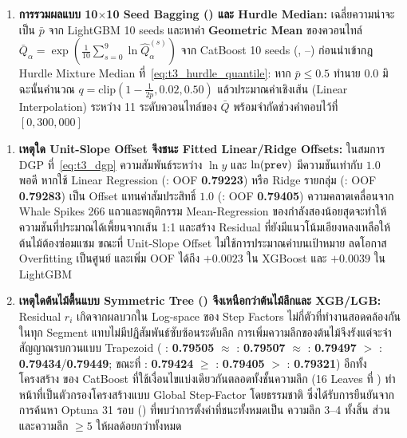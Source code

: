 \begin{enumerate}
\[    \]
    \item \textbf{การรวมผลแบบ 10$\times$10 Seed Bagging () และ Hurdle Median:} เฉลี่ยความน่าจะเป็น $\bar{p}$ จาก LightGBM 10 seeds และหาค่า \textbf{Geometric Mean} ของควอนไทล์ $\bar{Q}_{\alpha} = \exp\!\left(\frac{1}{10}\sum_{s=0}^{9}\ln \hat{Q}_{\alpha}^{(s)}\right)$ จาก CatBoost  10 seeds (, --) ก่อนนำเข้ากฎ Hurdle Mixture Median ที่~\eqref{eq:t3_hurdle_quantile}: หาก $\bar{p} \le 0.5$ ทำนาย $0.0$ มิฉะนั้นคำนวณ $q = \text{clip}(1 - \frac{1}{2\bar{p}}, 0.02, 0.50)$ แล้วประมาณค่าเชิงเส้น (Linear Interpolation) ระหว่าง 11 ระดับควอนไทล์ของ $\bar{Q}$ พร้อมจำกัดช่วงคำตอบไว้ที่ $[0, 300{,}000]$
\end{enumerate}

\begin{decisionbox}
\begin{enumerate}
    \item \textbf{เหตุใด Unit-Slope Offset จึงชนะ Fitted Linear/Ridge Offsets:} ในสมการ DGP ที่~\eqref{eq:t3_dgp} ความสัมพันธ์ระหว่าง $\ln y$ และ $\ln(\text{\texttt{prev}})$ มีความชันเท่ากับ $1.0$ พอดี หากใช้ Linear Regression (: OOF \textbf{0.79223}) หรือ Ridge รายกลุ่ม (: OOF \textbf{0.79283}) เป็น Offset แทนค่าสัมประสิทธิ์ $1.0$ (: OOF \textbf{0.79405}) ความคลาดเคลื่อนจาก Whale Spikes 266 แถวและพฤติกรรม Mean-Regression ของกำลังสองน้อยสุดจะทำให้ความชันที่ประมาณได้เพี้ยนจากเส้น 1:1 และสร้าง Residual ที่ยังมีแนวโน้มเอียงหลงเหลือให้ต้นไม้ต้องซ่อมแซม ขณะที่ Unit-Slope Offset ไม่ใช้การประมาณค่าบนเป้าหมาย ลดโอกาส Overfitting เป็นศูนย์ และเพิ่ม OOF ได้ถึง $+0.0023$ ใน XGBoost และ $+0.0039$ ใน LightGBM
    \item \textbf{เหตุใดต้นไม้ตื้นแบบ Symmetric Tree () จึงเหนือกว่าต้นไม้ลึกและ XGB/LGB:} Residual $r_i$ เกิดจากผลบวกใน Log-space ของ Step Factors ไม่กี่ตัวที่ทำงานสอดคล้องกันในทุก Segment แทบไม่มีปฏิสัมพันธ์ซับซ้อนระดับลึก การเพิ่มความลึกของต้นไม้จึงรังแต่จะจำสัญญาณรบกวนแบบ Trapezoid ( : \textbf{0.79505} $\approx$ : \textbf{0.79507} $\approx$ : \textbf{0.79497} $>$ : \textbf{0.79434}/\textbf{0.79449}; ขณะที่  : \textbf{0.79424} $\ge$ : \textbf{0.79405} $>$ : \textbf{0.79321}) อีกทั้งโครงสร้าง  ของ CatBoost ที่ใช้เงื่อนไขแบ่งเดียวกันตลอดทั้งชั้นความลึก (16 Leaves ที่ ) ทำหน้าที่เป็นตัวกรองโครงสร้างแบบ Global Step-Factor โดยธรรมชาติ ซึ่งได้รับการยืนยันจากการค้นหา Optuna 31 รอบ () ที่พบว่าการตั้งค่าที่ชนะทั้งหมดเป็น  ความลึก 3--4 ทั้งสิ้น ส่วน  และความลึก $\ge 5$ ให้ผลด้อยกว่าทั้งหมด
\end{enumerate}
\end{decisionbox}

